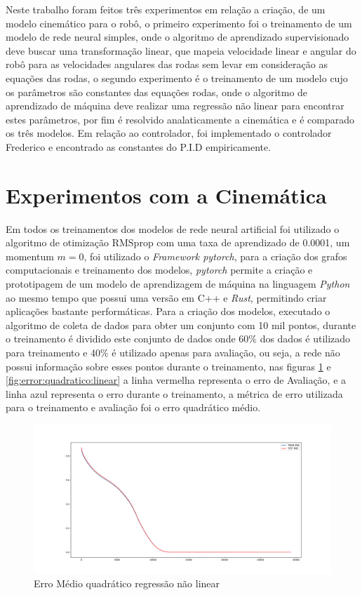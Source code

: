 
\label{Cap:ExperimentosResultados}
Neste trabalho foram feitos três experimentos em relação a criação,
de um modelo cinemático para o robô, o primeiro experimento foi o
treinamento de um modelo de rede neural simples, onde o algoritmo
de aprendizado supervisionado deve buscar uma transformação linear,
que mapeia velocidade linear e angular do robô para as velocidades
angulares das rodas sem levar em consideração as equações das rodas,
o segundo experimento é o treinamento de um modelo cujo os parâmetros
são constantes das equações rodas, onde o algoritmo de aprendizado
de máquina deve realizar uma regressão não linear para encontrar
estes parâmetros, por fim é resolvido analaticamente a cinemática
e é comparado os três modelos. Em relação ao controlador, foi implementado
o controlador Frederico e encontrado as constantes do P.I.D empiricamente.


\section{Experimentos com a Cinemática}
Em todos os treinamentos dos modelos
de rede neural artificial foi utilizado o algoritmo de otimização
RMSprop com uma taxa de aprendizado de 0.0001, um momentum $m =0$,
foi utilizado o \textit{Framework pytorch}, para a criação dos
grafos computacionais e treinamento dos modelos, \textit{pytorch}
permite a criação e prototipagem de um modelo de aprendizagem de
máquina na linguagem \textit{Python} ao mesmo tempo que possui
uma versão em C++ e \textit{Rust}, permitindo criar aplicações
bastante performáticas. Para a criação dos modelos, executado o
algoritmo de coleta de dados para obter um conjunto com 10 mil
pontos, durante o treinamento é dividido este conjunto de dados
onde 60\% dos dados é utilizado para treinamento e 40\% é utilizado
apenas para avaliação, ou seja, a rede não possui informação sobre esses
pontos durante o treinamento, nas figuras \ref{fig:error:quadratico:nao:linear} e
\ref{fig:error:quadratico:linear} a linha vermelha representa o erro de
Avaliação, e a linha azul representa o erro durante o treinamento,
a métrica de erro utilizada para o treinamento e avaliação
foi o erro quadrático médio.

\begin{figure}[H]
    \label{fig:error:quadratico:nao:linear}
    \centering
    \includegraphics[scale=0.3]{figuras/MSE_error_non_linear.pdf}
    \caption{Erro Médio quadrático regressão não linear}
\end{figure}

